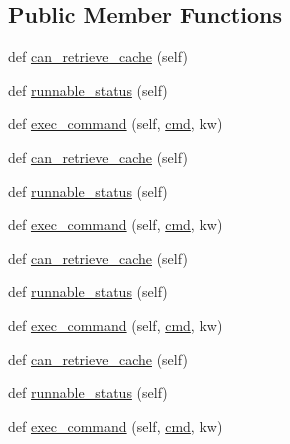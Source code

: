 \subsection*{Public Member Functions}
\begin{DoxyCompactItemize}
\item 
def \hyperlink{classwaflib_1_1_tools_1_1fc_1_1fcprogram__test_a913b9f380492fd2def08bdc554cdf700}{can\+\_\+retrieve\+\_\+cache} (self)
\item 
def \hyperlink{classwaflib_1_1_tools_1_1fc_1_1fcprogram__test_ac31ed0308a3b2605c1e6a7d03bceba16}{runnable\+\_\+status} (self)
\item 
def \hyperlink{classwaflib_1_1_tools_1_1fc_1_1fcprogram__test_ad7090713cc489c66c738ca5d8280e8e5}{exec\+\_\+command} (self, \hyperlink{sndfile__play_8m_adfc5ba7e22f5e4a6221c12a70503bef3}{cmd}, kw)
\item 
def \hyperlink{classwaflib_1_1_tools_1_1fc_1_1fcprogram__test_a913b9f380492fd2def08bdc554cdf700}{can\+\_\+retrieve\+\_\+cache} (self)
\item 
def \hyperlink{classwaflib_1_1_tools_1_1fc_1_1fcprogram__test_ac31ed0308a3b2605c1e6a7d03bceba16}{runnable\+\_\+status} (self)
\item 
def \hyperlink{classwaflib_1_1_tools_1_1fc_1_1fcprogram__test_ad7090713cc489c66c738ca5d8280e8e5}{exec\+\_\+command} (self, \hyperlink{sndfile__play_8m_adfc5ba7e22f5e4a6221c12a70503bef3}{cmd}, kw)
\item 
def \hyperlink{classwaflib_1_1_tools_1_1fc_1_1fcprogram__test_a913b9f380492fd2def08bdc554cdf700}{can\+\_\+retrieve\+\_\+cache} (self)
\item 
def \hyperlink{classwaflib_1_1_tools_1_1fc_1_1fcprogram__test_ac31ed0308a3b2605c1e6a7d03bceba16}{runnable\+\_\+status} (self)
\item 
def \hyperlink{classwaflib_1_1_tools_1_1fc_1_1fcprogram__test_ad7090713cc489c66c738ca5d8280e8e5}{exec\+\_\+command} (self, \hyperlink{sndfile__play_8m_adfc5ba7e22f5e4a6221c12a70503bef3}{cmd}, kw)
\item 
def \hyperlink{classwaflib_1_1_tools_1_1fc_1_1fcprogram__test_a913b9f380492fd2def08bdc554cdf700}{can\+\_\+retrieve\+\_\+cache} (self)
\item 
def \hyperlink{classwaflib_1_1_tools_1_1fc_1_1fcprogram__test_ac31ed0308a3b2605c1e6a7d03bceba16}{runnable\+\_\+status} (self)
\item 
def \hyperlink{classwaflib_1_1_tools_1_1fc_1_1fcprogram__test_ad7090713cc489c66c738ca5d8280e8e5}{exec\+\_\+command} (self, \hyperlink{sndfile__play_8m_adfc5ba7e22f5e4a6221c12a70503bef3}{cmd}, kw)

\end{DoxyCompactItemize}
